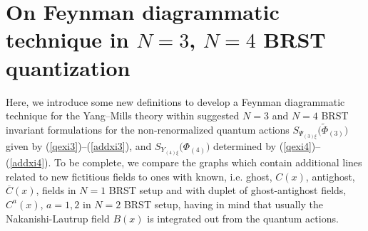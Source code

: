\documentclass[10pt]{article}
\begin{document}
\section{On Feynman diagrammatic technique in $N=3$, $N=4$ BRST quantization}
\label{diagram34}
 \setcounter{equation}{0}

Here, we introduce some  new definitions to develop a Feynman diagrammatic technique for the Yang--Mills theory within suggested $N=3$ and $N=4$ BRST invariant formulations for the  non-renormalized  quantum actions $ S_{\Psi_{(3)\xi}}\big(\widetilde{\Phi}_{(3)}\big)$ given by  (\ref{qexi3})--(\ref{addxi3}), and    $S_{Y_{(4)\xi}}\big({\Phi}_{(4)}\big)$ determined by  (\ref{qexi4})--(\ref{addxi4}). To be complete, we compare the graphs  which contain additional lines  related
to new fictitious fields   to ones with known, i.e. ghost, $C(x)$, antighost, $\overline{C}(x)$, fields in $N=1$ BRST setup and with duplet of ghost-antighost  fields, $C^a(x)$, $a=1,2$ in $N=2$ BRST setup, having in mind that usually the Nakanishi-Lautrup field $B(x)$ is integrated out from the quantum actions.
\end{document}
